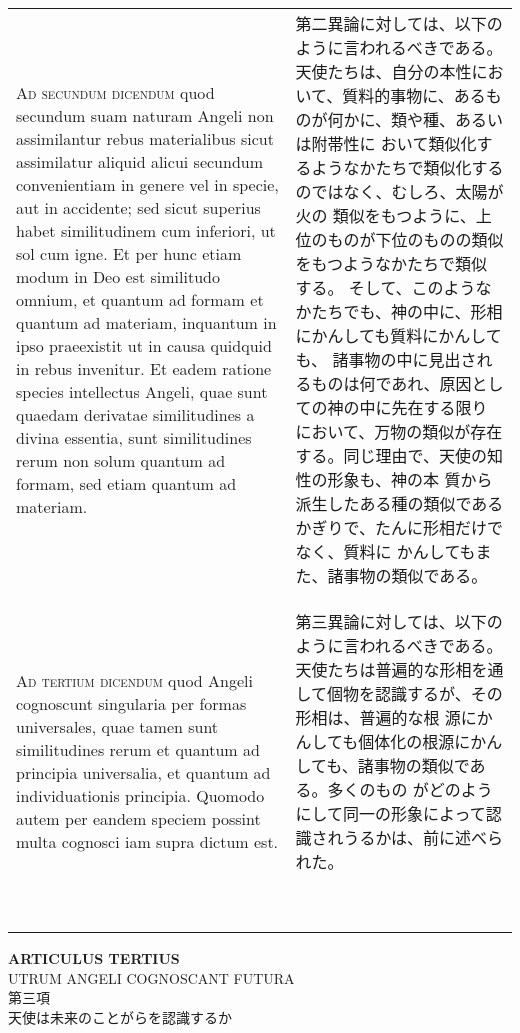 \documentclass[10pt]{jsarticle} %
\begin{document}
\begin{longtable}{p{21em}p{21em}}
\\


{\scshape Ad secundum dicendum} quod secundum suam
naturam Angeli non assimilantur rebus materialibus sicut assimilatur
aliquid alicui secundum convenientiam in genere vel in specie, aut in
accidente; sed sicut superius habet similitudinem cum inferiori, ut sol
cum igne. Et per hunc etiam modum in Deo est similitudo omnium, et
quantum ad formam et quantum ad materiam, inquantum in ipso praeexistit
ut in causa quidquid in rebus invenitur. Et eadem ratione species
intellectus Angeli, quae sunt quaedam derivatae similitudines a divina
essentia, sunt similitudines rerum non solum quantum ad formam, sed
etiam quantum ad materiam.


 &

 第二異論に対しては、以下のように言われるべきである。
 天使たちは、自分の本性において、質料的事物に、あるものが何かに、類や種、あるいは附帯性に
 おいて類似化するようなかたちで類似化するのではなく、むしろ、太陽が火の
 類似をもつように、上位のものが下位のものの類似をもつようなかたちで類似
 する。
そして、このようなかたちでも、神の中に、形相にかんしても質料にかんしても、
 諸事物の中に見出されるものは何であれ、原因としての神の中に先在する限り
 において、万物の類似が存在する。同じ理由で、天使の知性の形象も、神の本
 質から派生したある種の類似であるかぎりで、たんに形相だけでなく、質料に
 かんしてもまた、諸事物の類似である。


\\


{\scshape Ad tertium dicendum} quod Angeli cognoscunt
singularia per formas universales, quae tamen sunt similitudines rerum
et quantum ad principia universalia, et quantum ad individuationis
principia. Quomodo autem per eandem speciem possint multa cognosci iam
supra dictum est.


&

 第三異論に対しては、以下のように言われるべきである。
 天使たちは普遍的な形相を通して個物を認識するが、その形相は、普遍的な根
 源にかんしても個体化の根源にかんしても、諸事物の類似である。多くのもの
 がどのようにして同一の形象によって認識されうるかは、前に述べられた。
 

\

\end{longtable}
\newpage


\begin{center}
 {\Large {\bf ARTICULUS TERTIUS}}\\
 {\large UTRUM ANGELI COGNOSCANT FUTURA}\\
 {\Large 第三項\\天使は未来のことがらを認識するか}
\end{center}
\end{document}
